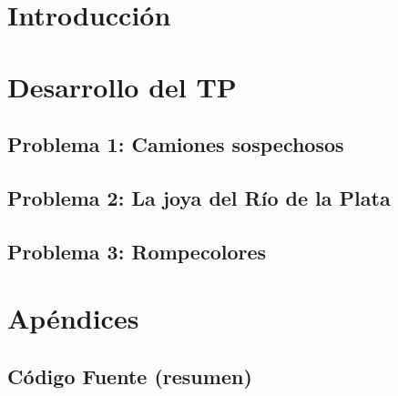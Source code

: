 \documentclass[11pt, a4paper, twoside]{article}
\begin{document}
{}
\newpage{\pagestyle{empty}\cleardoublepage}
\setcounter{page}{1}

\newpage{\pagestyle{empty}\tableofcontents\cleardoublepage}

\begin{TP1}
\section{Introducción}

\newpage

\section{Desarrollo del TP}
	
	\subsection{Problema 1: Camiones sospechosos}
	
	\newpage
	
	\subsection{Problema 2: La joya del Río de la Plata}
	
	\newpage
	
	\subsection{Problema 3: Rompecolores}
	
	\newpage

\section{Apéndices}
	
	\subsection{Código Fuente (resumen)}
	
	\clearpage
	
	

\end{TP1}
\end{document}
